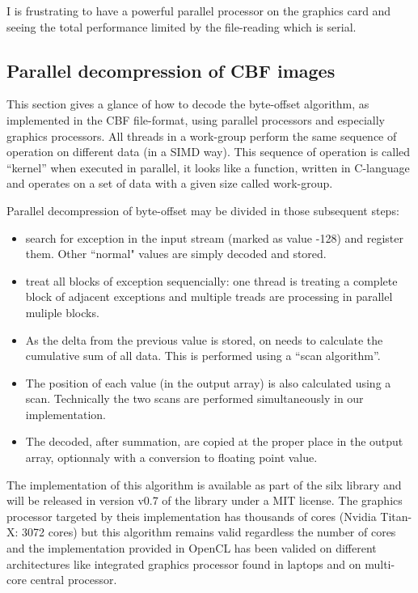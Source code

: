 \documentclass[preprint, pdf]{iucr}              %
\begin{document}
I is frustrating to have a powerful parallel processor on the
graphics card and seeing the total performance limited by the file-reading
which is serial.

\subsection{Parallel decompression of CBF images}
 
This section gives a glance of how to decode the byte-offset algorithm, as
implemented in the CBF file-format, using parallel processors and especially
graphics processors.
All threads in a work-group perform the same sequence of operation
on different data (in a SIMD way).
This sequence of operation is called ``kernel'' when executed in parallel, it
looks like a function, written in C-language and operates on a set of data with
a given size called work-group.

Parallel decompression of byte-offset may be divided in those subsequent steps:
\begin{itemize}
  \item search for exception in the input stream (marked as value -128) and
  register them. Other ``normal" values are simply decoded and stored.
  \item treat all blocks of exception sequencially: one thread is treating a
  complete block of adjacent exceptions and multiple treads are processing in
  parallel muliple blocks.
  \item As the delta from the previous value is stored, on needs to calculate
  the cumulative sum of all data. This is performed using a ``scan
  algorithm''\cite{scan}.
  \item The position of each value (in the output array) is also calculated
  using a scan. Technically the two scans are performed simultaneously in our
  implementation.
  \item The decoded, after summation, are copied at the proper place in the
  output array, optionnaly with a conversion to floating point value.
\end{itemize} 

The implementation of this algorithm is available as part of the silx
\cite{silx} library and will be released in version v0.7 of the library under a
MIT license.
The graphics processor targeted by theis implementation has thousands of cores
(Nvidia Titan-X: 3072 cores) but this algorithm remains valid regardless the
number of cores and the implementation provided in OpenCL \cite{pyopencl} has
been valided on different architectures like integrated graphics processor found
in laptops and on multi-core central processor.
\end{document}
